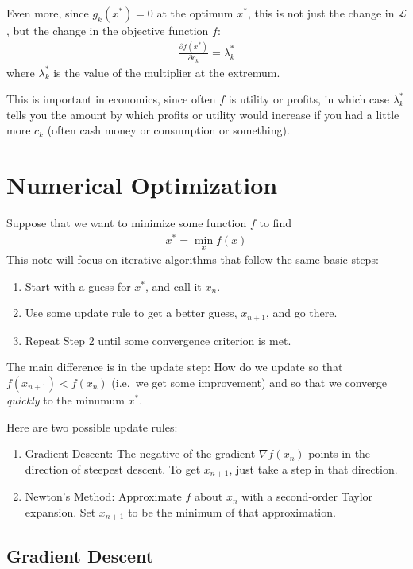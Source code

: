 \documentclass[a4paper,12pt]{scrartcl}
\theoremstyle{definition}
\theoremstyle{remark}
\begin{document}
Even more, since $g_k(x^*)=0$ at the optimum $x^*$, this is not just the
change in $\mathscr{L}$, but the change in the objective function $f$:
\begin{align*}
  \frac{\partial f(x^*)}{\partial c_k} = \lambda^*_k
\end{align*}
where $\lambda^*_k$ is the value of the multiplier at the extremum.

This is important in economics, since often $f$ is utility or profits,
in which case $\lambda^*_k$ tells you the amount by which profits or
utility would increase if you had a little more $c_k$ (often cash money
or consumption or something).


\clearpage
\section{Numerical Optimization}

Suppose that we want to minimize some function $f$ to find
\begin{align}
  \label{statement}
  x^* = \min_x f(x)
\end{align}
This note will focus on iterative algorithms that follow the same basic
steps:
\begin{enumerate}
  \item Start with a guess for $x^*$, and call it $x_n$.
  \item Use some update rule to get a better guess, $x_{n+1}$, and go
    there.
  \item Repeat Step 2 until some convergence criterion is met.
\end{enumerate}
The main difference is in the update step: How do we update so that
$f(x_{n+1}) < f(x_n)$ (i.e.\ we get some improvement) and so that we
converge \emph{quickly} to the minumum $x^*$.

Here are two possible update rules:
\begin{enumerate}
  \item Gradient Descent: The negative of the gradient $\nabla f(x_n)$
    points in the direction of steepest descent. To get $x_{n+1}$, just
    take a step in that direction.
  \item Newton's Method: Approximate $f$ about $x_n$ with a second-order
    Taylor expansion. Set $x_{n+1}$ to be the minimum of that approximation.
\end{enumerate}


\subsection{Gradient Descent}
\end{document}

